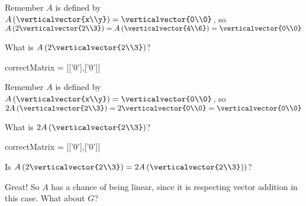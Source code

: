 \documentclass{ximera}
\begin{document}
\begin{question}
\begin{solution}
\begin{hint}
        \begin{question}
        	
        	\begin{solution}
		\begin{hint}
			Remember $A$ is defined by $A\left(\verticalvector{x\\y}\right) = \verticalvector{0\\0}$, so
			$A\left(2\verticalvector{2\\3}\right) = A\left(\verticalvector{4\\6}\right)=\verticalvector{0\\0}$
		\end{hint}
        	 What is $A\left(2\verticalvector{2\\3}\right)$?
        	\begin{matrix-answer}[name=v]
    			  correctMatrix = [['0'],['0']]
        	 \end{matrix-answer}
        	\end{solution}
        	\begin{solution}
		\begin{hint}
			Remember $A$ is defined by $A\left(\verticalvector{x\\y}\right) = \verticalvector{0\\0}$, so
			$2A\left(\verticalvector{2\\3}\right) = 2\verticalvector{0\\0} = \verticalvector{0\\0}$
		\end{hint}
        	 What is $2A\left(\verticalvector{2\\3}\right)$?
        	 \begin{matrix-answer}[name=v]
    			  correctMatrix = [['0'],['0']]
        	 \end{matrix-answer}
        	\end{solution}
        	\begin{solution}
        		Is $A\left(2\verticalvector{2\\3}\right) = 2A\left(\verticalvector{2\\3}\right))$?
        		\begin{multiple-choice}
        		\choice[correct]{Yes}
        		\choice{No}
        		\end{multiple-choice}
        	\end{solution}
        	
        	Great!  So $A$ has a chance of being linear, since it is respecting vector addition in this case.
        	What about $G$?        	
        	

\end{question}
\end{hint}
\end{solution}
\end{question}
\end{document}
